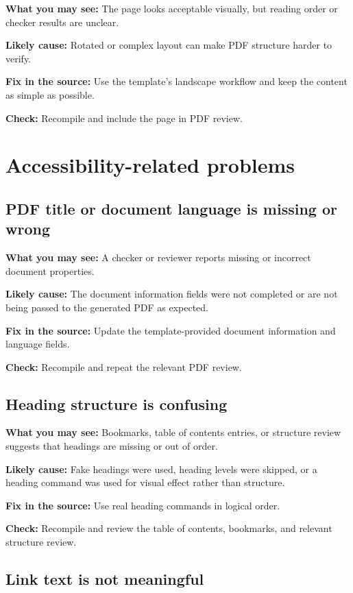 \textbf{What you may see:} The page looks acceptable visually, but reading order or checker results are unclear.

\textbf{Likely cause:} Rotated or complex layout can make PDF structure harder to verify.

\textbf{Fix in the source:} Use the template's landscape workflow and keep the content as simple as possible.

\textbf{Check:} Recompile and include the page in PDF review.

\section{Accessibility-related problems}
\label{sec:accessibility-related-problems}

\subsection{PDF title or document language is missing or wrong}
\label{subsec:pdf-title-language-wrong}

\textbf{What you may see:} A checker or reviewer reports missing or incorrect document properties.

\textbf{Likely cause:} The document information fields were not completed or are not being passed to the generated PDF as expected.

\textbf{Fix in the source:} Update the template-provided document information and language fields.

\textbf{Check:} Recompile and repeat the relevant PDF review.

\subsection{Heading structure is confusing}
\label{subsec:heading-structure-confusing}

\textbf{What you may see:} Bookmarks, table of contents entries, or structure review suggests that headings are missing or out of order.

\textbf{Likely cause:} Fake headings were used, heading levels were skipped, or a heading command was used for visual effect rather than structure.

\textbf{Fix in the source:} Use real heading commands in logical order.

\textbf{Check:} Recompile and review the table of contents, bookmarks, and relevant structure review.

\subsection{Link text is not meaningful}
\label{subsec:link-text-not-meaningful}

